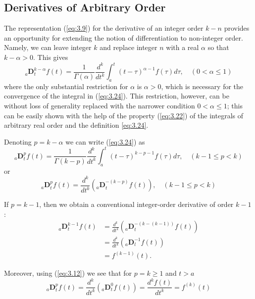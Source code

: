 \documentclass[a4paper,14pt,oneside]{book}
\theoremstyle{plain}
\theoremstyle{definition}
\theoremstyle{remark}
\begin{document}
\begin{center}
\begin{flushleft}
\section{Derivatives of Arbitrary Order}
The representation (\ref{eq:3.9}) for the derivative of an integer order $k-n$ provides an opportunity for extending the notion of differentiation to non-integer order. Namely, we can leave integer $k$ and replace integer $n$ with a real $\alpha$ so that $k-\alpha>0$. This gives
\begin{equation}\label{eq:3.24}
{ }_{a} \mathbf{D}_{t}^{k-\alpha} f(t)=\frac{1}{\Gamma(\alpha)} \frac{d^{k}}{d t^{k}} \int_{a}^{t}(t-\tau)^{\alpha-1} f(\tau) d \tau, \quad(0<\alpha \leq 1)
\end{equation}
where the only substantial restriction for $\alpha$ is $\alpha>0$, which is necessary for the convergence of the integral in (\ref{eq:3.24}). This restriction, however, can be without loss of generality replaced with the narrower condition $0<\alpha \leq 1$; this can be easily shown with the help of the property (\ref{eq:3.22}) of the integrals of arbitrary real order and the definition \ref{eq:3.24}. 
\par Denoting $p=k-\alpha$ we can write (\ref{eq:3.24}) as
\begin{equation}\label{eq:3.25}
{ }_{a} \mathbf{D}_{t}^{p} f(t)=\frac{1}{\Gamma(k-p)} \frac{d^{k}}{d t^{k}} \int_{a}^{t}(t-\tau)^{k-p-1} f(\tau) d \tau, \quad(k-1 \leq p<k)
\end{equation}
or
\begin{equation}\label{eq:3.26}
{ }_{a} \mathbf{D}_{t}^{p} f(t)=\frac{d^{k}}{d t^{k}}\left({ }_{a} \mathbf{D}_{t}^{-(k-p)} f(t)\right), \quad(k-1 \leq p<k)
\end{equation}
\par If $p=k-1$, then we obtain a conventional integer-order derivative of order $k-1$ :
$$
\begin{aligned}
{ }_{a} \mathbf{D}_{t}^{k-1} f(t) &=\frac{d^{k}}{d t^{k}}\left({ }_{a} \mathbf{D}_{t}^{-(k-(k-1))} f(t)\right) \\
&=\frac{d^{k}}{d t^{k}}\left({ }_{a} \mathbf{D}_{l}^{-1} f(t)\right)\\
&=f^{(k-1)}(t).
\end{aligned}
$$
\par Moreover, using (\ref{eq:3.12}) we see that for $p=k \geq 1$ and $t>a$ 
\begin{equation}\label{eq:3.27}
{ }_{a} \mathbf{D}_{t}^{p} f(t)=\frac{d^{k}}{d t^{k}}\left({ }_{a} \mathbf{D}_{t}^{0} f(t)\right)=\frac{d^{k} f(t)}{d t^{k}}=f^{(k)}(t)

\end{equation}
\end{flushleft}
\end{center}
\end{document}
